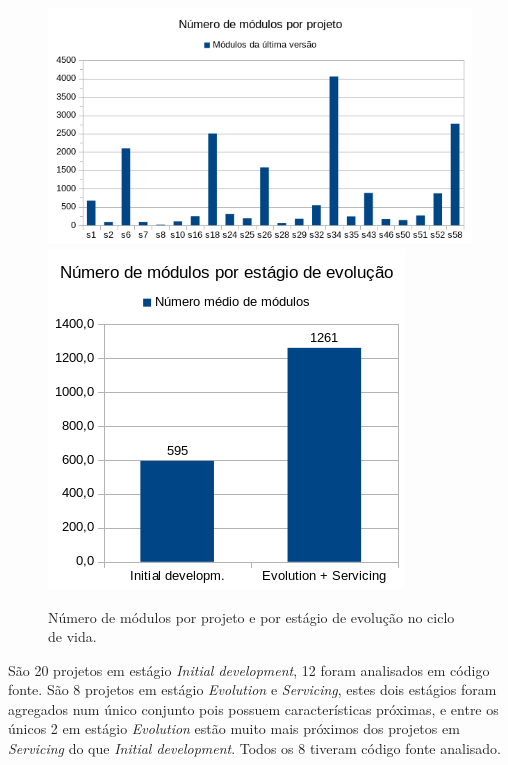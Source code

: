 \begin{figure}[h]
  \center
  \includegraphics[scale=0.6]{imagens/modules-total.png}
  \includegraphics[scale=0.6]{imagens/modules-average.png}
  \caption{Número de módulos por projeto e por estágio de evolução no ciclo de vida.}
  \label{modules-average}
\end{figure}


São 20 projetos em estágio {\it Initial development}, 12 foram analisados em
código fonte. São 8 projetos em estágio {\it Evolution} e {\it Servicing},
estes dois estágios foram agregados num único conjunto pois possuem
características próximas, e entre os únicos 2 em estágio {\it Evolution} estão
muito mais próximos dos projetos em {\it Servicing} do que {\it Initial
development}. Todos os 8 tiveram código fonte analisado.

